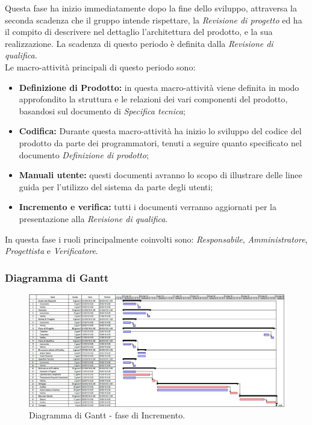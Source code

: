 \documentclass[a4paper]{article}
\begin{document}
			Questa fase ha inizio immediatamente dopo la fine dello sviluppo, attraversa la seconda 
			scadenza che il gruppo intende rispettare, la \emph{Revisione di progetto} ed ha il compito di descrivere nel dettaglio 
			l'architettura del prodotto, e la sua realizzazione. La scadenza di questo periodo è definita dalla 
			\emph{Revisione di qualifica}. \\
			Le macro-attività principali di questo periodo sono:
			\begin{itemize}
				\item \textbf{Definizione di Prodotto:} in questa macro-attività viene definita in modo approfondito la struttura e le relazioni 
				dei vari componenti del prodotto, basandosi sul documento di \emph{Specifica tecnica}; 
				\item \textbf{Codifica:} Durante questa macro-attività ha inizio lo sviluppo del codice del prodotto da parte dei programmatori, 
				tenuti a seguire quanto specificato nel documento \emph{Definizione di prodotto};
				\item \textbf{Manuali utente:} questi documenti avranno lo scopo di illustrare delle linee guida per l'utilizzo 
				del sistema da parte degli utenti;
				\item \textbf{Incremento e verifica:} tutti i documenti verranno aggiornati per la presentazione alla 
				\emph{Revisione di qualifica}.
			\end{itemize}
			In questa fase i ruoli principalmente coinvolti sono: \emph{Responsabile}, \emph{Amministratore},
			\emph{Progettista} e \emph{Verificatore}.

			\subsubsection{Diagramma di Gantt}
				\begin{figure}[H]
					\centering
					\includegraphics[width=\textwidth]{gantt_incremento}
					\caption{Diagramma di Gantt - fase di Incremento.}
				\end{figure}
\end{document}
